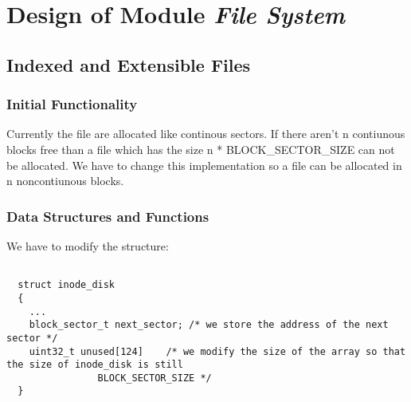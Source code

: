\chapter{Design of Module \textit{File System}}


\section{Indexed and Extensible Files}
\subsection{Initial Functionality}
  
Currently the file are allocated like continous sectors. If there aren't n contiunous blocks free than a 
file which has the size n * BLOCK\_SECTOR\_SIZE can not be allocated. We have to change this implementation
so a file can be allocated in n noncontiunous blocks.

\subsection{Data Structures and Functions}

We have to modify the structure:

\begin{lstlisting}

  struct inode_disk
  {
    ...
    block_sector_t next_sector; /* we store the address of the next sector */
    uint32_t unused[124]	/* we modify the size of the array so that the size of inode_disk is still 
				BLOCK_SECTOR_SIZE */
  }

\end{lstlisting}

